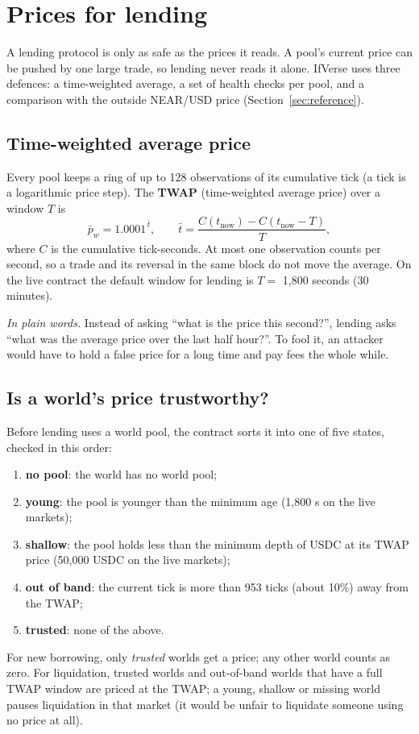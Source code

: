 \documentclass[11pt,a4paper]{article}
\newcommand{\inwords}[1]{\par\noindent\colorbox{note}{\parbox{\dimexpr\linewidth-2\fboxsep}{\small\textit{In plain words.} #1}}\par}
\begin{document}
\section{Prices for lending}
\label{sec:prices}

A lending protocol is only as safe as the prices it reads. A pool's current price can be pushed by one large trade,
so lending never reads it alone. IfVerse uses three defences: a time-weighted average, a set of health checks per
pool, and a comparison with the outside NEAR/USD price (Section~\ref{sec:reference}).

\subsection{Time-weighted average price}

Every pool keeps a ring of up to 128 observations of its cumulative tick (a tick is a logarithmic price step).
The \textbf{TWAP} (time-weighted average price) over a window $T$ is
\begin{equation}
  \bar{p}_w = 1.0001^{\,\bar{t}}, \qquad \bar{t} = \frac{C(t_{\text{now}}) - C(t_{\text{now}} - T)}{T},
  \label{eq:twap}
\end{equation}
where $C$ is the cumulative tick-seconds. At most one observation counts per second, so a trade and its reversal in
the same block do not move the average. On the live contract the default window for lending is $T =$ 1,800 seconds
(30 minutes).
\inwords{Instead of asking ``what is the price this second?'', lending asks ``what was the average price over the
last half hour?''. To fool it, an attacker would have to hold a false price for a long time and pay fees the whole
while.}

\subsection{Is a world's price trustworthy?}

Before lending uses a world pool, the contract sorts it into one of five states, checked in this order:
\begin{enumerate}
  \item \textbf{no pool}: the world has no world pool;
  \item \textbf{young}: the pool is younger than the minimum age (1,800 s on the live markets);
  \item \textbf{shallow}: the pool holds less than the minimum depth of USDC at its TWAP price (50,000 USDC on the
  live markets);
  \item \textbf{out of band}: the current tick is more than 953 ticks (about 10\%) away from the TWAP;
  \item \textbf{trusted}: none of the above.
\end{enumerate}
For new borrowing, only \emph{trusted} worlds get a price; any other world counts as zero. For liquidation, trusted
worlds and out-of-band worlds that have a full TWAP window are priced at the TWAP; a young, shallow or missing world
pauses liquidation in that market (it would be unfair to liquidate someone using no price at all).
\end{document}
